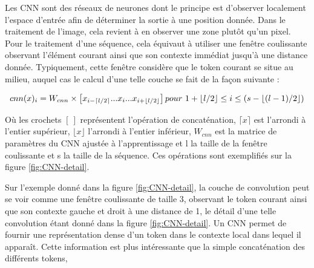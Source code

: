\documentclass[PhD-Yoann-Dupont.tex]{subfiles}
\begin{document}
Les CNN sont des réseaux de neurones dont le principe est d'observer localement l'espace d'entrée afin de déterminer la sortie à une position donnée. Dans le traitement de l'image, cela revient à en observer une zone plutôt qu'un pixel. Pour le traitement d'une séquence, cela équivaut à utiliser une fenêtre coulissante observant l'élément courant ainsi que son contexte immédiat jusqu'à une distance donnée. Typiquement, cette fenêtre considère que le token courant se situe au milieu, auquel cas le calcul d'une telle couche se fait de la façon suivante :

\begin{equation}\label{eq:CNN-formula}
cnn(x)_{i} = W_{cnn} \times \left[ x_{i-\lceil l/2 \rceil} ... x_{i} ... x_{i+ \lfloor l/2 \rfloor} \right]\\ pour\ 1+\lfloor l/2 \rfloor \leq i \leq (s - \lfloor (l-1)/2 \rfloor)
\end{equation}

Où les crochets $[\ ]$ représentent l'opération de concaténation, $\lceil x \rceil$ est l'arrondi à l'entier supérieur, $\lfloor x \rfloor$ l'arrondi à l'entier inférieur, $W_{cnn}$ est la matrice de paramètres du CNN ajustée à l'apprentissage et l la taille de la fenêtre coulissante et s la taille de la séquence. Ces opérations sont exemplifiés sur la figure \ref{fig:CNN-detail}.

Sur l'exemple donné dans la figure \ref{fig:CNN-detail}, la couche de convolution peut se voir comme une fenêtre coulissante de taille 3, observant le token courant ainsi que son contexte gauche et droit à une distance de 1, le détail d'une telle convolution étant donné dans la figure \ref{fig:CNN-detail}. Un CNN permet de fournir une représentation dense d'un token dans le contexte local dans lequel il apparaît. Cette information est plus intéressante que la simple concaténation des différents tokens,
\end{document}
